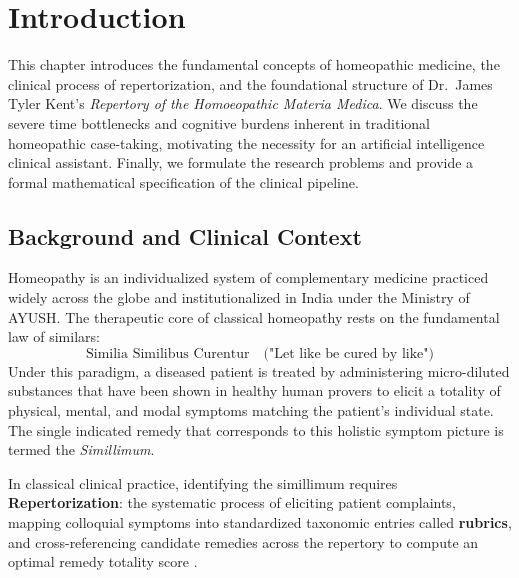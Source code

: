 \chapter{Introduction}
\label{Chapter1}

\begin{sloppypar}
This chapter introduces the fundamental concepts of homeopathic medicine, the clinical process of repertorization, and the foundational structure of Dr.~James Tyler Kent's \emph{Repertory of the Homoeopathic Materia Medica}. We discuss the severe time bottlenecks and cognitive burdens inherent in traditional homeopathic case-taking, motivating the necessity for an artificial intelligence clinical assistant. Finally, we formulate the research problems and provide a formal mathematical specification of the clinical pipeline.

\section{Background and Clinical Context}
Homeopathy is an individualized system of complementary medicine practiced widely across the globe and institutionalized in India under the Ministry of AYUSH. The therapeutic core of classical homeopathy rests on the fundamental law of similars:
\begin{equation}
    \text{Similia Similibus Curentur} \quad \text{("Let like be cured by like")}
\end{equation}
Under this paradigm, a diseased patient is treated by administering micro-diluted substances that have been shown in healthy human provers to elicit a totality of physical, mental, and modal symptoms matching the patient's individual state. The single indicated remedy that corresponds to this holistic symptom picture is termed the \emph{Simillimum}.

In classical clinical practice, identifying the simillimum requires \textbf{Repertorization}: the systematic process of eliciting patient complaints, mapping colloquial symptoms into standardized taxonomic entries called \textbf{rubrics}, and cross-referencing candidate remedies across the repertory to compute an optimal remedy totality score \cite{Kent1897}.


\end{sloppypar}
